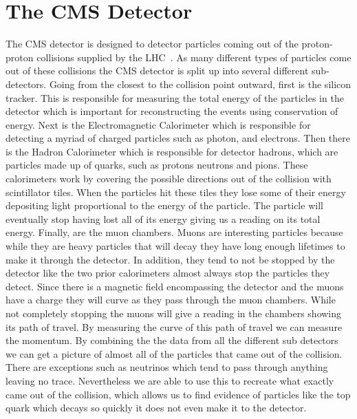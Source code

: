 \section{The CMS Detector}
The CMS detector is designed to detector particles coming out of the proton-proton collisions supplied by the LHC~\cite{CMS}. As many different types of particles come out of these collisions the CMS detector is split up into several different sub-detectors. Going from the closest to the collision point outward, first is the silicon tracker. This is responsible for measuring the total energy of the particles in the detector which is important for reconstructing the events using conservation of energy. Next is the Electromagnetic Calorimeter which is responsible for detecting a myriad of charged particles such as photon, and electrons. Then there is the Hadron Calorimeter which is responsible for detector hadrons, which are particles made up of quarks, such as protons neutrons and pions. These calorimeters work by covering the possible directions out of the collision with scintillator tiles. When the particles hit these tiles they lose some of their energy depositing light proportional to the energy of the particle. The particle will eventually stop having lost all of its energy giving us a reading on its total energy. Finally, are the muon chambers. Muons are interesting particles because while they are heavy particles that will decay they have long enough lifetimes to make it through the detector. In addition, they tend to not be stopped by the detector like the two prior calorimeters almost always stop the particles they detect. Since there is a magnetic field encompassing the detector and the muons have a charge they will curve as they pass through the muon chambers. While not completely stopping the muons will give a reading in the chambers showing its path of travel. By measuring the curve of this path of travel we can measure the momentum. By combining the the data from all the different sub detectors we can get a picture of almost all of the particles that came out of the collision. There are exceptions such as neutrinos which tend to pass through anything leaving no trace. Nevertheless we are able to use this to recreate what exactly came out of the collision, which allows us to find evidence of particles like the top quark which decays so quickly it does not even make it to the detector.

